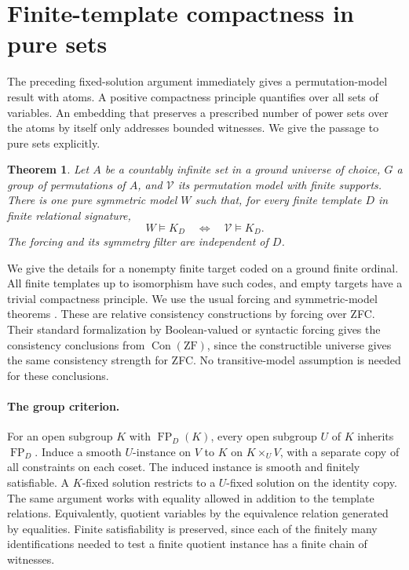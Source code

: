 \documentclass[11pt]{article}
\newtheorem{theorem}{Theorem}
\newcommand{\FP}{\operatorname{FP}}
\begin{document}
\section{Finite-template compactness in pure sets}
The preceding fixed-solution argument immediately gives a permutation-model result with atoms. A positive compactness principle quantifies over all sets of variables. An embedding that preserves a prescribed number of power sets over the atoms by itself only addresses bounded witnesses. We give the passage to pure sets explicitly.

\begin{theorem}\label{transfer}
Let $A$ be a countably infinite set in a ground universe of choice, $G$ a group of permutations of $A$, and $\mathcal V$ its permutation model with finite supports. There is one pure symmetric model $W$ such that, for every finite template $D$ in finite relational signature,
\[
                  W\models K_D\quad\Longleftrightarrow\quad\mathcal V\models K_D.
\]
The forcing and its symmetry filter are independent of $D$.
\end{theorem}
We give the details for a nonempty finite target coded on a ground finite ordinal. All finite templates up to isomorphism have such codes, and empty targets have a trivial compactness principle. We use the usual forcing and symmetric-model theorems \cite{jech}. These are relative consistency constructions by forcing over ZFC. Their standard formalization by Boolean-valued or syntactic forcing gives the consistency conclusions from $\operatorname{Con}(\mathrm{ZF})$, since the constructible universe gives the same consistency strength for ZFC. No transitive-model assumption is needed for these conclusions.

\paragraph{The group criterion.}
For an open subgroup $K$ with $\FP_D(K)$, every open subgroup $U$ of $K$ inherits $\FP_D$. Induce a smooth $U$-instance on $V$ to $K$ on $K\times_U V$, with a separate copy of all constraints on each coset. The induced instance is smooth and finitely satisfiable. A $K$-fixed solution restricts to a $U$-fixed solution on the identity copy. The same argument works with equality allowed in addition to the template relations. Equivalently, quotient variables by the equivalence relation generated by equalities. Finite satisfiability is preserved, since each of the finitely many identifications needed to test a finite quotient instance has a finite chain of witnesses.
\end{document}

